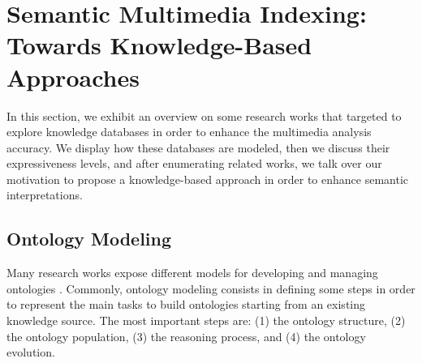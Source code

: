 \section{Semantic Multimedia Indexing: Towards Knowledge-Based Approaches}

	In this section, we exhibit an overview on some research works that targeted to explore
	knowledge databases in order to enhance the multimedia analysis accuracy. We display 
	how these databases are modeled, then we discuss their expressiveness levels, and after 
	enumerating related works, we talk over our motivation to propose a knowledge-based approach 
	in order to enhance semantic interpretations.

	\subsection{Ontology Modeling}
	
	Many research works expose different models for developing 
	and managing ontologies \citep{Sure1999,Fernandez-Lopez1999,Noy2001,Vrandecic2005,Gargouri2010,Terkaj2014,Zablith2015}.
	Commonly, ontology modeling consists in 
	defining some steps in order to represent the main tasks to build ontologies starting from an existing knowledge 
	source. The most important steps are: (1) the ontology structure, (2) the ontology population, (3) the reasoning 
	process, and (4) the ontology evolution.
		
